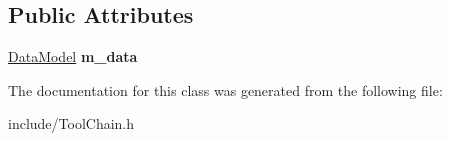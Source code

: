 \subsection*{Public Attributes}
\begin{DoxyCompactItemize}
\item 
\hypertarget{classToolChain_a92c81316d0c0b16ee9e4a084dd976f83}{\hyperlink{classDataModel}{Data\-Model} {\bfseries m\-\_\-data}}\label{classToolChain_a92c81316d0c0b16ee9e4a084dd976f83}

\end{DoxyCompactItemize}


The documentation for this class was generated from the following file\-:\begin{DoxyCompactItemize}
\item 
include/Tool\-Chain.\-h\end{DoxyCompactItemize}
